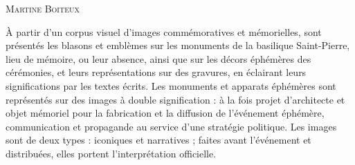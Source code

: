 \documentclass[12pt,twoside,openany]{book}
\newcommand{\PurhContributors}[1]{%
  \par\vspace{0.5\baselineskip}%
  {\normalsize\scshape #1\par}%
  \vspace{0.6\baselineskip}%
}
\begin{document}
\PurhContributors{Martine Boiteux}

À partir d’un corpus visuel d’images commémoratives et mémorielles, sont présentés les blasons et emblèmes sur les monuments de la basilique Saint-Pierre, lieu de mémoire, ou leur absence, ainsi que sur les décors éphémères des cérémonies, et leurs représentations sur des gravures, en éclairant leurs significations par les textes écrits. Les monuments et apparats éphémères sont représentés sur des images à double signification : à la fois projet d’architecte et objet mémoriel pour la fabrication et la diffusion de l’événement éphémère, communication et propagande au service d’une stratégie politique. Les images sont de deux types : iconiques et narratives ; faites avant l’événement et distribuées, elles portent l’interprétation officielle.
\end{document}

